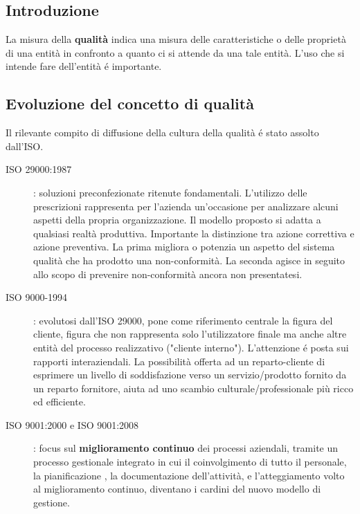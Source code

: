 \documentclass[a4paper]{article}
\begin{document}
\subsection{Introduzione}
La misura della \textbf{qualità} indica una misura delle caratteristiche o delle 
proprietà di una entità in confronto a quanto ci si attende da una tale entità.\newline
L'uso che si intende fare dell'entità é importante.
\subsection{Evoluzione del concetto di qualità}
Il rilevante compito di diffusione della cultura della qualità é stato assolto dall'ISO.\newline
\begin{description}
    \item[ISO 29000:1987]: soluzioni preconfezionate ritenute fondamentali. L'utilizzo 
    delle prescrizioni rappresenta per l'azienda un'occasione per analizzare alcuni 
    aspetti della propria organizzazione. Il modello proposto si adatta a qualsiasi realtà
    produttiva. Importante la distinzione tra azione correttiva e azione preventiva. La 
    prima migliora o potenzia un aspetto del sistema qualità che ha prodotto una 
    non-conformità. La seconda agisce in seguito allo scopo di prevenire non-conformità 
    ancora non presentatesi.
    \item[ISO 9000-1994]: evolutosi dall'ISO 29000, pone come riferimento centrale la 
    figura del cliente, figura che non rappresenta solo l'utilizzatore finale ma anche 
    altre entità del processo realizzativo ("cliente interno"). L'attenzione é posta 
    sui rapporti interaziendali. La possibilità offerta ad un reparto-cliente di esprimere 
    un livello di soddisfazione verso un servizio/prodotto fornito da un reparto fornitore, 
    aiuta ad uno scambio culturale/professionale più ricco ed efficiente.
    \item[ISO 9001:2000 e ISO 9001:2008]: focus sul \textbf{miglioramento continuo} 
    dei processi aziendali, tramite un processo gestionale integrato in cui il 
    coinvolgimento di tutto il personale, la pianificazione , la documentazione 
    dell'attività, e l'atteggiamento volto al miglioramento continuo, diventano i 
    cardini del nuovo modello di gestione.
\end{description}
\end{document}
